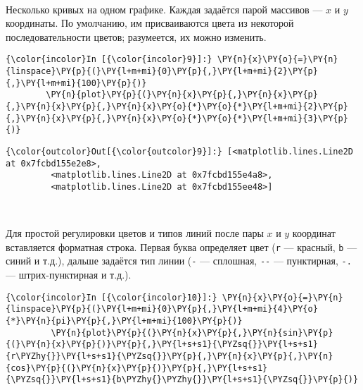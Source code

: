     \begin{center}
    \end{center}
    { \hspace*{\fill} \\}
    
    Несколько кривых на одном графике. Каждая задаётся парой массивов ---
\(x\) и \(y\) координаты. По умолчанию, им присваиваются цвета из
некоторой последовательности цветов; разумеется, их можно изменить.

    \begin{Verbatim}[commandchars=\\\{\}]
{\color{incolor}In [{\color{incolor}9}]:} \PY{n}{x}\PY{o}{=}\PY{n}{linspace}\PY{p}{(}\PY{l+m+mi}{0}\PY{p}{,}\PY{l+m+mi}{2}\PY{p}{,}\PY{l+m+mi}{100}\PY{p}{)}
        \PY{n}{plot}\PY{p}{(}\PY{n}{x}\PY{p}{,}\PY{n}{x}\PY{p}{,}\PY{n}{x}\PY{p}{,}\PY{n}{x}\PY{o}{*}\PY{o}{*}\PY{l+m+mi}{2}\PY{p}{,}\PY{n}{x}\PY{p}{,}\PY{n}{x}\PY{o}{*}\PY{o}{*}\PY{l+m+mi}{3}\PY{p}{)}
\end{Verbatim}

            \begin{Verbatim}[commandchars=\\\{\}]
{\color{outcolor}Out[{\color{outcolor}9}]:} [<matplotlib.lines.Line2D at 0x7fcbd155e2e8>,
         <matplotlib.lines.Line2D at 0x7fcbd155e4a8>,
         <matplotlib.lines.Line2D at 0x7fcbd155ee48>]
\end{Verbatim}
        
    \begin{center}
    \end{center}
    { \hspace*{\fill} \\}
    
    Для простой регулировки цветов и типов линий после пары \(x\) и \(y\)
координат вставляется форматная строка. Первая буква определяет цвет
(\texttt{\textquotesingle{}r\textquotesingle{}} --- красный,
\texttt{\textquotesingle{}b\textquotesingle{}} --- синий и т.д.), дальше
задаётся тип линии (\texttt{\textquotesingle{}-\textquotesingle{}} ---
сплошная, \texttt{\textquotesingle{}-\/-\textquotesingle{}} ---
пунктирная, \texttt{\textquotesingle{}-.\textquotesingle{}} ---
штрих-пунктирная и т.д.).

    \begin{Verbatim}[commandchars=\\\{\}]
{\color{incolor}In [{\color{incolor}10}]:} \PY{n}{x}\PY{o}{=}\PY{n}{linspace}\PY{p}{(}\PY{l+m+mi}{0}\PY{p}{,}\PY{l+m+mi}{4}\PY{o}{*}\PY{n}{pi}\PY{p}{,}\PY{l+m+mi}{100}\PY{p}{)}
         \PY{n}{plot}\PY{p}{(}\PY{n}{x}\PY{p}{,}\PY{n}{sin}\PY{p}{(}\PY{n}{x}\PY{p}{)}\PY{p}{,}\PY{l+s+s1}{\PYZsq{}}\PY{l+s+s1}{r\PYZhy{}}\PY{l+s+s1}{\PYZsq{}}\PY{p}{,}\PY{n}{x}\PY{p}{,}\PY{n}{cos}\PY{p}{(}\PY{n}{x}\PY{p}{)}\PY{p}{,}\PY{l+s+s1}{\PYZsq{}}\PY{l+s+s1}{b\PYZhy{}\PYZhy{}}\PY{l+s+s1}{\PYZsq{}}\PY{p}{)}
\end{Verbatim}

